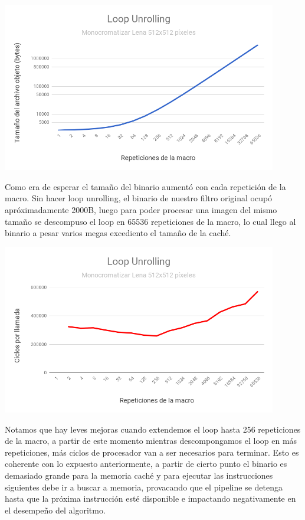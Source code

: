 \begin{center}

	\includegraphics[width=0.9\textwidth]{imagenes/loopunrolling/size.png}

\end{center}

Como era de esperar el tamaño del binario aumentó con cada repetición de la macro. Sin hacer loop unrolling, el binario de nuestro filtro original ocupó apróximadamente 2000B, luego para poder procesar una imagen del mismo tamaño se descompuso el loop en 65536 repeticiones de la macro, lo cual llego al binario a pesar varios megas excediento el tamaño de la caché.

\begin{center}

	\includegraphics[width=0.9\textwidth]{imagenes/loopunrolling/time.png}

\end{center}

Notamos que hay leves mejoras cuando extendemos el loop hasta 256 repeticiones de la macro, a partir de este momento mientras descompongamos el loop en más repeticiones, más ciclos de procesador van a ser necesarios para terminar. Esto es coherente con lo expuesto anteriormente, a partir de cierto punto el binario es demasiado grande para la memoria caché y para ejecutar las instrucciones siguientes debe ir a buscar a memoria, provacando que el pipeline se detenga hasta que la próxima instrucción esté disponible e impactando negativamente en el desempeño del algoritmo.

